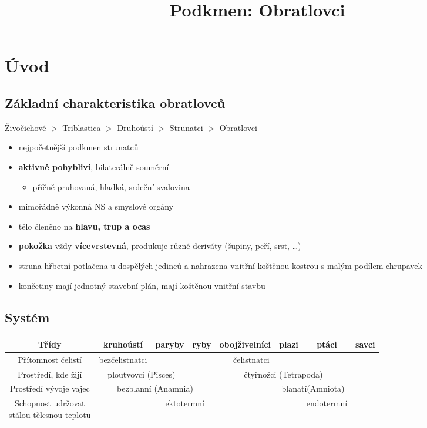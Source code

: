 \title{Podkmen: Obratlovci}


\section{Úvod}
\subsection{Základní charakteristika obratlovců}
Živočichové $>$ Triblastica $>$ Druhoústí $>$ Strunatci $>$ Obratlovci
\begin{itemize}
\item nejpočetnější podkmen strunatců
\item \textbf{aktivně pohybliví}, bilaterálně souměrní
	\begin{itemize}
	\item příčně pruhovaná, hladká, srdeční svalovina
	\end{itemize}
\item mimořádně výkonná NS a smyslové orgány
\item tělo členěno na \textbf{hlavu, trup a ocas}
\item \textbf{pokožka} vždy \textbf{vícevrstevná}, produkuje různé deriváty (šupiny, peří, srst, \ldots)
\item struna hřbetní potlačena u dospělých jedinců a nahrazena vnitřní koštěnou kostrou s malým podílem chrupavek
\item končetiny mají jednotný stavební plán, mají koštěnou vnitřní stavbu
\end{itemize}

\subsection{Systém}
\begin{tabular}{|c|c|c|c|c|c|c|c|}
\hline
Třídy&kruhoústí&paryby&ryby&obojživelníci&plazi&ptáci&savci		\\ \hline
Přítomnost čelistí&bezčelistnatci& \multicolumn{5}{c}{čelistnatci} &		\\ \hline
Prostředí, kde žijí & \multicolumn{2}{c}{ploutvovci (Pisces)} && \multicolumn{3}{c}{čtyřnožci (Tetrapoda)} &\\ \hline
Prostředí vývoje vajec & \multicolumn{3}{c}{bezblanní (Anamnia)} && \multicolumn{2}{c}{blanatí(Amniota)} &		\\ \hline
\makecell{Schopnost udržovat \\ stálou tělesnou teplotu}	& \multicolumn{4}{c}{ektotermní} && \multicolumn{1}{c}{endotermní} &	\\ \hline
\end{tabular}

